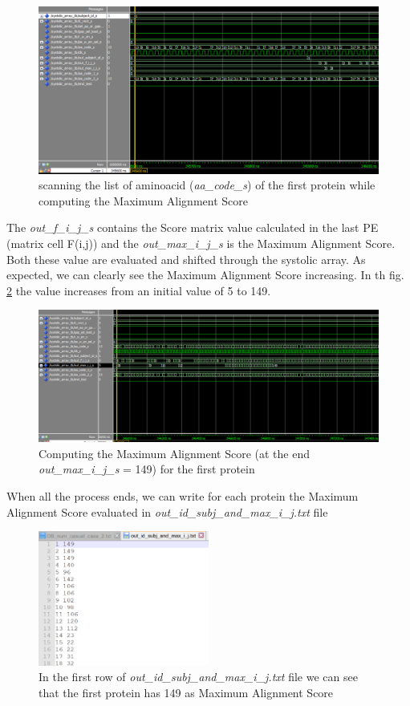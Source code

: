 \begin{figure}[h!]
	\centering
	\includegraphics[width=\textwidth]{imm/sw/evaluating_output_1.png}
	\caption{scanning the list of aminoacid (\textit{aa\_code\_s}) of the first protein while computing the Maximum Alignment Score } 
	\label{output_evaluation_1}
\end{figure}

The\textit{ out\_f\_i\_j\_s} contains the Score matrix value calculated in the last PE (matrix cell F(i,j)) and the \textit{out\_max\_i\_j\_s} is the Maximum Alignment Score. Both these value are evaluated and shifted through the systolic array. As expected,  we can clearly see the Maximum Alignment Score increasing. In th fig. \ref{149} the value increases from an initial value of 5 to 149.
\begin{figure}[h!]
	\centering
	\includegraphics[width=\textwidth]{imm/sw/149.png}
	\caption{Computing the  Maximum Alignment Score (at the end \textit{out\_max\_i\_j\_s} = 149) for the first protein } 
	\label{149}
\end{figure}
When all the process ends, we can write for each protein the Maximum Alignment Score evaluated in \textit{out\_id\_subj\_and\_max\_i\_j.txt} file

\begin{figure}[h!]
	\centering
	\includegraphics[width=0.5\textwidth]{imm/sw/out_149.png}
	\caption{In the first row of \textit{out\_id\_subj\_and\_max\_i\_j.txt} file we can see that the first protein has 149 as Maximum Alignment Score} 
	\label{out149}
\end{figure}
